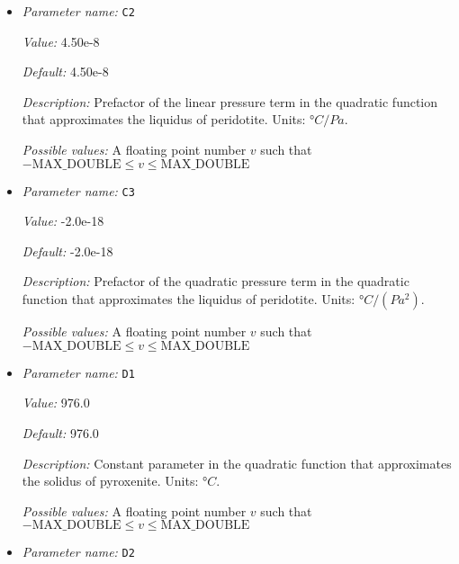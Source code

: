 \begin{itemize}
{\it Default:} 1780.0


{\it Description:} Constant parameter in the quadratic function that approximates the liquidus of peridotite. Units: $°C$.


{\it Possible values:} A floating point number $v$ such that $-\text{MAX\_DOUBLE} \leq v \leq \text{MAX\_DOUBLE}$
\item {\it Parameter name:} {\tt C2}
\label{parameters:Postprocess/Visualization/Melt fraction/C2}
\label{parameters:Postprocess/Visualization/Melt_20fraction/C2}


{\it Value:} 4.50e-8


{\it Default:} 4.50e-8


{\it Description:} Prefactor of the linear pressure term in the quadratic function that approximates the liquidus of peridotite. Units: $°C/Pa$.


{\it Possible values:} A floating point number $v$ such that $-\text{MAX\_DOUBLE} \leq v \leq \text{MAX\_DOUBLE}$
\item {\it Parameter name:} {\tt C3}
\label{parameters:Postprocess/Visualization/Melt fraction/C3}
\label{parameters:Postprocess/Visualization/Melt_20fraction/C3}


{\it Value:} -2.0e-18


{\it Default:} -2.0e-18


{\it Description:} Prefactor of the quadratic pressure term in the quadratic function that approximates the liquidus of peridotite. Units: $°C/(Pa^2)$.


{\it Possible values:} A floating point number $v$ such that $-\text{MAX\_DOUBLE} \leq v \leq \text{MAX\_DOUBLE}$
\item {\it Parameter name:} {\tt D1}
\label{parameters:Postprocess/Visualization/Melt fraction/D1}
\label{parameters:Postprocess/Visualization/Melt_20fraction/D1}


{\it Value:} 976.0


{\it Default:} 976.0


{\it Description:} Constant parameter in the quadratic function that approximates the solidus of pyroxenite. Units: $°C$.


{\it Possible values:} A floating point number $v$ such that $-\text{MAX\_DOUBLE} \leq v \leq \text{MAX\_DOUBLE}$
\item {\it Parameter name:} {\tt D2}
\label{parameters:Postprocess/Visualization/Melt fraction/D2}
\label{parameters:Postprocess/Visualization/Melt_20fraction/D2}



\end{itemize}
